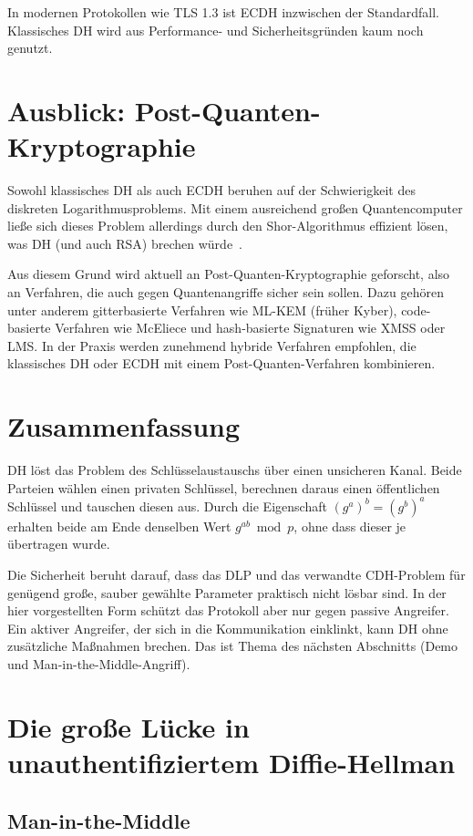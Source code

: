 \documentclass[conference]{IEEEtran}
\begin{document}
In modernen Protokollen wie TLS 1.3 ist ECDH inzwischen der
Standardfall. Klassisches DH wird aus Performance- und
Sicherheitsgründen kaum noch genutzt.

\section{Ausblick: Post-Quanten-Kryptographie}

Sowohl klassisches DH als auch ECDH beruhen auf der Schwierigkeit des
diskreten Logarithmusproblems. Mit einem ausreichend großen
Quantencomputer ließe sich dieses Problem allerdings durch den
Shor-Algorithmus effizient lösen, was DH (und auch RSA) brechen
würde~\cite{nist-pqc}.

Aus diesem Grund wird aktuell an Post-Quanten-Kryptographie geforscht,
also an Verfahren, die auch gegen Quantenangriffe sicher sein sollen.
Dazu gehören unter anderem gitterbasierte Verfahren wie ML-KEM (früher
Kyber), code-basierte Verfahren wie McEliece und hash-basierte
Signaturen wie XMSS oder LMS. In der Praxis werden zunehmend
hybride Verfahren empfohlen, die klassisches DH oder ECDH mit einem
Post-Quanten-Verfahren kombinieren.

\section{Zusammenfassung}

DH löst das Problem des Schlüsselaustauschs über einen unsicheren
Kanal. Beide Parteien wählen einen privaten Schlüssel, berechnen
daraus einen öffentlichen Schlüssel und tauschen diesen aus. Durch
die Eigenschaft $(g^a)^b = (g^b)^a$ erhalten beide am Ende denselben
Wert $g^{ab} \bmod p$, ohne dass dieser je übertragen wurde.

Die Sicherheit beruht darauf, dass das DLP und das verwandte
CDH-Problem für genügend große, sauber gewählte Parameter praktisch
nicht lösbar sind. In der hier vorgestellten Form schützt das
Protokoll aber nur gegen passive Angreifer. Ein aktiver Angreifer,
der sich in die Kommunikation einklinkt, kann DH ohne zusätzliche
Maßnahmen brechen. Das ist Thema des nächsten Abschnitts (Demo und
Man-in-the-Middle-Angriff).

\section{Die große Lücke in unauthentifiziertem Diffie-Hellman} \label{AuthDH}
\subsection{Man-in-the-Middle}
\end{document}
